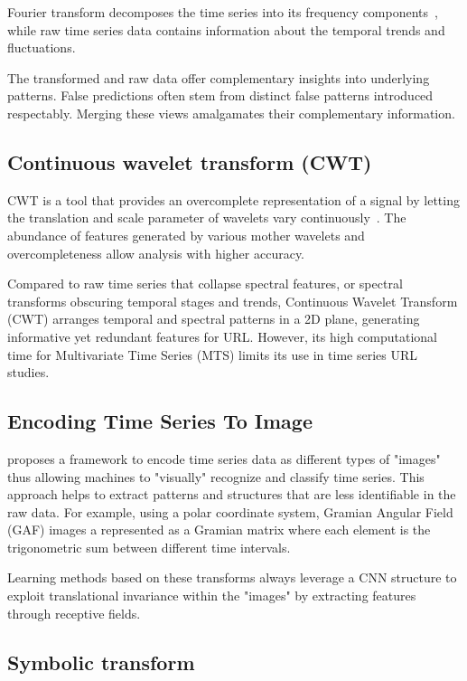 \documentclass{article}
\begin{document}
Fourier transform decomposes the time series into its frequency components~\cite{winograd1978computing}, while raw time series data contains information about the temporal trends and fluctuations.


The transformed and raw data offer complementary insights into underlying patterns. False predictions often stem from distinct false patterns introduced respectably. Merging these views amalgamates their complementary information.

\subsection{Continuous wavelet transform (CWT)}

CWT is a tool that provides an overcomplete representation of a signal by letting the translation and scale parameter of wavelets vary continuously~\cite{grossmann1990reading}. The abundance of features generated by various mother wavelets and overcompleteness allow analysis with higher accuracy. 

Compared to raw time series that collapse spectral features, or spectral transforms obscuring temporal stages and trends, Continuous Wavelet Transform (CWT) arranges temporal and spectral patterns in a 2D plane, generating informative yet redundant features for URL. However, its high computational time for Multivariate Time Series (MTS) limits its use in time series URL studies.

\subsection{Encoding Time Series To Image}\label{sec:imag}

\cite{wang2015encoding} proposes a framework to encode time series data as different types of "images" thus allowing machines to "visually" recognize and classify time series. This approach helps to extract patterns and structures that are less identifiable in the raw data. For example, using a polar coordinate system, Gramian Angular Field (GAF) images a represented as a Gramian matrix where each element is the trigonometric sum between different time intervals.   

Learning methods based on these transforms always leverage a CNN structure to exploit translational invariance within the "images" by extracting features through receptive fields.

\subsection{Symbolic transform}
\end{document}
